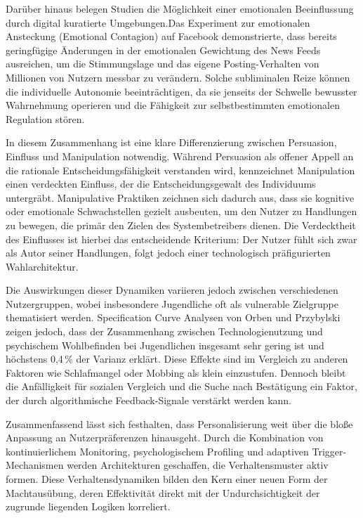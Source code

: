 Darüber hinaus belegen Studien die Möglichkeit einer emotionalen Beeinflussung durch digital kuratierte Umgebungen.Das Experiment zur emotionalen Ansteckung (Emotional Contagion) auf Facebook demonstrierte, dass bereits geringfügige Änderungen in der emotionalen Gewichtung des News Feeds ausreichen, um die Stimmungslage und das eigene Posting-Verhalten von Millionen von Nutzern messbar zu verändern. Solche subliminalen Reize können die individuelle Autonomie beeinträchtigen, da sie jenseits der Schwelle bewusster Wahrnehmung operieren und die Fähigkeit zur selbstbestimmten emotionalen Regulation stören.

In diesem Zusammenhang ist eine klare Differenzierung zwischen Persuasion, Einfluss und Manipulation notwendig. Während Persuasion als offener Appell an die rationale Entscheidungsfähigkeit verstanden wird, kennzeichnet Manipulation einen verdeckten Einfluss, der die Entscheidungsgewalt des Individuums untergräbt. Manipulative Praktiken zeichnen sich dadurch aus, dass sie kognitive oder emotionale Schwachstellen gezielt ausbeuten, um den Nutzer zu Handlungen zu bewegen, die primär den Zielen des Systembetreibers dienen. Die Verdecktheit des Einflusses ist hierbei das entscheidende Kriterium: Der Nutzer fühlt sich zwar als Autor seiner Handlungen, folgt jedoch einer technologisch präfigurierten Wahlarchitektur.

Die Auswirkungen dieser Dynamiken variieren jedoch zwischen verschiedenen Nutzergruppen, wobei insbesondere Jugendliche oft als vulnerable Zielgruppe thematisiert werden. Specification Curve Analysen von Orben und Przybylski zeigen jedoch, dass der Zusammenhang zwischen Technologienutzung und psychischem Wohlbefinden bei Jugendlichen insgesamt sehr gering ist und höchstens 0,4\,\% der Varianz erklärt. Diese Effekte sind im Vergleich zu anderen Faktoren wie Schlafmangel oder Mobbing als klein einzustufen. Dennoch bleibt die Anfälligkeit für sozialen Vergleich und die Suche nach Bestätigung ein Faktor, der durch algorithmische Feedback-Signale verstärkt werden kann.

Zusammenfassend lässt sich festhalten, dass Personalisierung weit über die bloße Anpassung an Nutzerpräferenzen hinausgeht. Durch die Kombination von kontinuierlichem Monitoring, psychologischem Profiling und adaptiven Trigger-Mechanismen werden Architekturen geschaffen, die Verhaltensmuster aktiv formen. Diese Verhaltensdynamiken bilden den Kern einer neuen Form der Machtausübung, deren Effektivität direkt mit der Undurchsichtigkeit der zugrunde liegenden Logiken korreliert.
